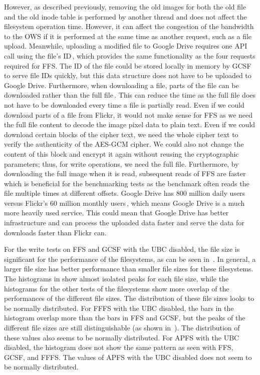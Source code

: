However, as described previously, removing the old images for both the old file and the old inode table is performed by another thread and does not affect the filesystem operation time. However, it can affect the congestion of the bandwidth to the \gls{OWS} if it is performed at the same time as another request, such as a file upload. Meanwhile, uploading a modified file to Google Drive requires one \gls{API} call using the file's ID\,\cite{FilesUpdateDrive2022}, which provides the same functionality as the four requests required for \gls{FFS}. The ID of the file could be stored locally in memory by \gls{GCSF} to serve file IDs quickly, but this data structure does not have to be uploaded to Google Drive. Furthermore, when downloading a file, parts of the file can be downloaded rather than the full file\,\cite{googleDownloadFilesDrive2022}. This can reduce the time as the full file does not have to be downloaded every time a file is partially read. Even if we could download parts of a file from Flickr, it would not make sense for \gls{FFS} as we need the full file content to decode the image pixel data to plain text. Even if we could download certain blocks of the cipher text, we need the whole cipher text to verify the authenticity of the \mbox{\gls{AES}-\gls{GCM}} cipher. We could also not change the content of this block and encrypt it again without reusing the cryptographic parameters; thus, for write operations, we need the full file. Furthermore, by downloading the full image when it is read, subsequent reads of \gls{FFS} are faster which is beneficial for the benchmarking tests as the benchmark often reads the file multiple times at different offsets. Google Drive has 800 million daily users\,\cite{lardinoisGoogleUpdatesDrive2017} versus Flickr's 60 million monthly users\,\cite{campbellFlickrStatistics20222022}, which means Google Drive is a much more heavily used service. This could mean that Google Drive has better infrastructure and can process the uploaded data faster and serve the data for downloads faster than Flickr can.

For the write tests on \gls{FFS} and \gls{GCSF} with the \gls{UBC} disabled, the file size is significant for the performance of the filesystems, as can be seen in~. In general, a larger file size has better performance than smaller file sizes for these filesystems. The histograms in   show almost isolated peaks for each file size, while the histograms for the other tests of the filesystems show more overlap of the performances of the different file sizes. The distribution of these file sizes looks to be normally distributed. For \gls{FFFS} with the \gls{UBC} disabled, the bars in the histogram overlap more than the bars in \gls{FFS} and \gls{GCSF}, but the peaks of the different file sizes are still distinguishable (as shown in~). The distribution of these values also seems to be normally distributed. For \gls{APFS} with the \gls{UBC} disabled, the histogram does not show the same pattern as seen with \gls{FFS}, \gls{GCSF}, and \gls{FFFS}. The values of \gls{APFS} with the \gls{UBC} disabled does not seem to be normally distributed.


